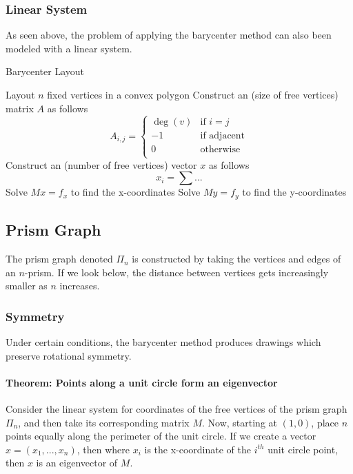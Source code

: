 \documentclass[11pt]{article}
\begin{document}
\subsubsection{Linear System}
As seen above, the problem of applying the barycenter method can also been modeled with a linear system.

\begin{algorithm}
    \caption{Barycenter Layout}\label{euclid}
    \begin{algorithmic}[1]       
        \State Layout $n$ fixed vertices in a convex polygon
        \State Construct an (size of free vertices) matrix $A$ as follows
        \[
        A_{i, j} = \begin{cases}
            \deg(v) &{\text{if $i = j$}} \\
            -1      &{\text{if adjacent}} \\
            0       &{\text{otherwise}} \\
        \end{cases}
        \]
        \State Construct an (number of free vertices) vector $x$ as follows
        \[
        x_{i} = \sum{...}
        \]
        \State Solve $Mx = f_x$ to find the x-coordinates
        \State Solve $My = f_y$ to find the y-coordinates
        \EndProcedure
    \end{algorithmic}
\end{algorithm}

\subsection{Prism Graph}
The prism graph denoted $\Pi_{n}$ is constructed by taking the vertices and edges of an $n$-prism. If we look below, the distance between vertices gets increasingly smaller as $n$ increases.

\subsubsection{Symmetry}
Under certain conditions, the barycenter method produces drawings which preserve rotational symmetry.

\paragraph{Theorem: Points along a unit circle form an eigenvector} Consider the linear system for coordinates of the free vertices of the prism graph $\Pi_n$, and then take its corresponding matrix $M$. Now, starting at $(1, 0)$, place $n$ points equally along the perimeter of the unit circle. If we create a vector $x = (x_1, ..., x_n)$, then where $x_i$ is the x-coordinate of the $i^{th}$ unit circle point, then $x$ is an eigenvector of $M$.
\end{document}
